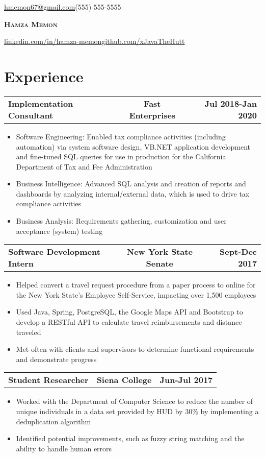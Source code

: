 \documentclass[letterpaper,11pt]{article}
\makeatletter
\newcommand{\resumeItem}[1]{
  \item\small{#1}
  \vspace{-2pt}
}
\newcommand{\resumeSubheading}[3]{
  \begin{tabular*}{\textwidth}{l@{\extracolsep{\fill}}c@{\extracolsep{\fill}}r}
    \textbf{#1} & \textbf{#2} & \textbf{#3}
  \end{tabular*}
  \vspace{-17pt}
}
\newcommand{\resumeItemListStart}{\begin{itemize}}
\newcommand{\resumeItemListEnd}{\end{itemize}\vspace{-5pt}}
\newcommand\name{Hamza Memon}
\newcommand\printname{
  \typeout {kokoko}
  \typeout \spaceskip
  \textbf{\LARGE{\textsc{\name}}}
}
\newcommand\email{hmemon67@gmail.com}
\makeatother
\begin{document}
\begin{minipage}[b]{0.33333\textwidth}
  \raggedright
  \href{mailto:{\email}}{\email}\linebreak(555) 555-5555
\end{minipage}%
\begin{minipage}[b]{0.33333\textwidth}
  \centering
  \printname
\end{minipage}%
\begin{minipage}[b]{0.33333\textwidth}
  \raggedleft
  \href{http://www.linkedin.com/in/hamza-memon}{linkedin.com/in/hamza-memon}\linebreak\href{http://www.github.com/xJavaTheHutt}{github.com/xJavaTheHutt}
\end{minipage}%


\section{Experience}
  \resumeSubheading{Implementation Consultant}{Fast Enterprises}{Jul 2018-Jan 2020}
    \resumeItemListStart
      \resumeItem{Software Engineering: Enabled tax compliance activities (including automation) via
      system software design, VB.NET application development and fine-tuned SQL queries for use in
    production for the California Department of Tax and Fee Administration}
      \resumeItem{Business Intelligence: Advanced SQL analysis and creation of reports and dashboards by analyzing internal/external data, which is used to drive tax compliance activities}
      \resumeItem{Business Analysis: Requirements gathering, customization and user acceptance (system) testing}
    \resumeItemListEnd
      
  \resumeSubheading{Software Development Intern}{New York State Senate}{Sept-Dec 2017}
    \resumeItemListStart
      \resumeItem{Helped convert a travel request procedure from a paper process to online for the New York State's Employee Self-Service, impacting over 1,500 employees}
      \resumeItem{Used Java, Spring, PostgreSQL, the Google Maps API and Bootstrap to develop a RESTful API to calculate travel reimbursements and distance traveled}
      \resumeItem{Met often with clients and supervisors to determine functional requirements and demonstrate progress}
    \resumeItemListEnd

  \resumeSubheading{Student Researcher}{Siena College}{Jun-Jul 2017}
    \resumeItemListStart
      \resumeItem{Worked with the Department of Computer Science to reduce the number of unique individuals in a data set provided by HUD by 30\% by implementing a deduplication algorithm}
      \resumeItem{Identified potential improvements, such as fuzzy string matching and the ability to handle human errors}
    \resumeItemListEnd
\end{document}
